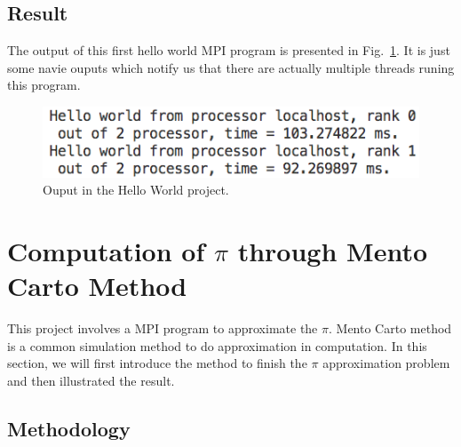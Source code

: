 \documentclass[10pt,twocolumn,letterpaper]{article}
\begin{document}
    \subsection{Result}
    The output of this first hello world MPI program is presented in Fig.~\ref{hello_world}.
    It is just some navie ouputs which notify us that there are actually multiple threads 
    runing this program.
    \begin{figure}[t]
        \begin{center}
           \includegraphics[width=1.\linewidth]{images/hello_world.png}
        \end{center}
           \caption{Ouput in the Hello World project.}
        \label{fig:long}
        \label{fig:onecol}
        \label{hello_world}
    \end{figure}
    
    \section{Computation of $\pi$ through Mento Carto Method}
    This project involves a MPI program to approximate the $\pi$. Mento Carto method is a 
    common simulation method to do approximation in computation. In this section, we will
    first introduce the method to finish the $\pi$ approximation problem and then illustrated
    the result.
    \subsection{Methodology}
    
\end{document}
